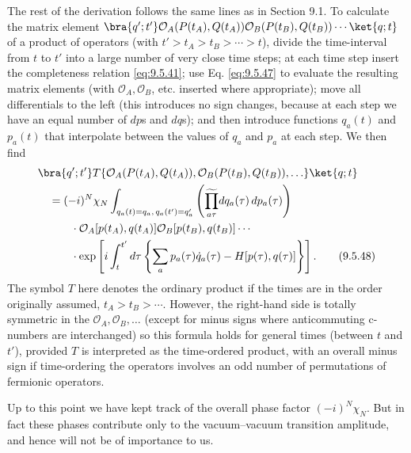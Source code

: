 The rest of the derivation follows the same lines as in Section 9.1. To
calculate the matrix element
$\bra{q';t'}\mathcal{O}_A(P(t_A),Q(t_A))
\mathcal{O}_B(P(t_B),Q(t_B))\cdots\ket{q;t}$ of a product of operators (with
$t'>t_A>t_B>\cdots>t$), divide the time-interval from $t$ to $t'$ into a large
number of very close time steps; at each time step insert the completeness
relation \eqref{eq:9.5.41}; use Eq. \eqref{eq:9.5.47} to evaluate the resulting matrix elements
(with $\mathcal{O}_A,\mathcal{O}_B$, etc. inserted where appropriate); move all
differentials to the left (this introduces no sign changes, because at each
step we have an equal number of $dp$s and $dq$s); and then introduce functions
$q_a(t)$ and $p_a(t)$ that interpolate between the values of $q_a$ and $p_a$ at
each step. We then find
\begin{align}
&\bra{q';t'}T\{\mathcal{O}_A(P(t_A),Q(t_A)),
 \mathcal{O}_B(P(t_B),Q(t_B)),\ldots\}\ket{q;t}
\notag\\
&\quad=(-i)^N\chi_N
 \int_{q_a(t)=q_a,\,q_a(t')=q'_a}
 \left(\widetilde{\prod_{a\tau}}dq_a(\tau)\,dp_a(\tau)\right)
 \notag\\
&\qquad\quad\cdot
 \mathcal{O}_A[p(t_A),q(t_A)]
 \mathcal{O}_B[p(t_B),q(t_B)]\cdots
 \notag\\
&\qquad\quad\cdot
 \exp\left[i\int_t^{t'}d\tau
 \left\{\sum_ap_a(\tau)\dot q_a(\tau)
 -H[p(\tau),q(\tau)]\right\}\right].
\tag{9.5.48}\label{eq:9.5.48}
\end{align}
The symbol $T$ here denotes the ordinary product if the times are in the order
originally assumed, $t_A>t_B>\cdots$. However, the right-hand side is totally
symmetric in the $\mathcal{O}_A,\mathcal{O}_B,\ldots$ (except for minus signs
where anticommuting c-numbers are interchanged) so this formula holds for
general times (between $t$ and $t'$), provided $T$ is interpreted as the
time-ordered product, with an overall minus sign if time-ordering the operators
involves an odd number of permutations of fermionic operators.

Up to this point we have kept track of the overall phase factor
$(-i)^N\chi_N$. But in fact these phases contribute only to the vacuum--vacuum
transition amplitude, and hence will not be of importance to us.

